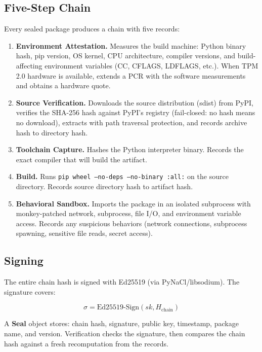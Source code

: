 \documentclass[11pt,a4paper]{article}
\begin{document}
\subsection{Five-Step Chain}

Every sealed package produces a chain with five records:

\begin{enumerate}
  \item \textbf{Environment Attestation.} Measures the build machine: Python binary hash, pip version, OS kernel, CPU architecture, compiler versions, and build-affecting environment variables (CC, CFLAGS, LDFLAGS, etc.). When TPM 2.0 hardware is available, extends a PCR with the software measurements and obtains a hardware quote.

  \item \textbf{Source Verification.} Downloads the source distribution (sdist) from PyPI, verifies the SHA-256 hash against PyPI's registry (fail-closed: no hash means no download), extracts with path traversal protection, and records archive hash to directory hash.

  \item \textbf{Toolchain Capture.} Hashes the Python interpreter binary. Records the exact compiler that will build the artifact.

  \item \textbf{Build.} Runs \texttt{pip wheel --no-deps --no-binary :all:} on the source directory. Records source directory hash to artifact hash.

  \item \textbf{Behavioral Sandbox.} Imports the package in an isolated subprocess with monkey-patched network, subprocess, file I/O, and environment variable access. Records any suspicious behaviors (network connections, subprocess spawning, sensitive file reads, secret access).
\end{enumerate}

\subsection{Signing}

The entire chain hash is signed with Ed25519 (via PyNaCl/libsodium). The signature covers:

\begin{equation}
  \sigma = \text{Ed25519-Sign}(sk, H_{\text{chain}})
\end{equation}

A \textbf{Seal} object stores: chain hash, signature, public key, timestamp, package name, and version. Verification checks the signature, then compares the chain hash against a fresh recomputation from the records.
\end{document}
